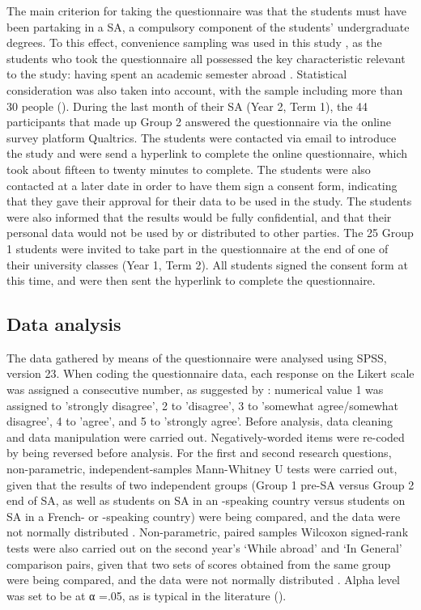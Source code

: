 \documentclass[output=paper]{langsci/langscibook}
\begin{document}
The main criterion for taking the questionnaire was that the students must have been partaking in a SA, a compulsory component of the students’ undergraduate degrees. To this effect, convenience sampling was used in this study \citep{Dörnyei2007}, as the students who took the questionnaire all possessed the key characteristic relevant to the study: having spent an academic semester abroad \citep{Aiken1997}. Statistical consideration was also taken into account, with the sample including more than 30 people (\citealt{HatchLazaraton1991}). During the last month of their SA (Year 2, Term 1), the 44 participants that made up Group 2 answered the questionnaire via the online survey platform Qualtrics. The students were contacted via email to introduce the study and were send a hyperlink to complete the online questionnaire, which took about fifteen to twenty minutes to complete. The students were also contacted at a later date in order to have them sign a consent form, indicating that they gave their approval for their data to be used in the study. The students were also informed that the results would be fully confidential, and that their personal data would not be used by or distributed to other parties.  The 25 Group 1 students were invited to take part in the questionnaire at the end of one of their university classes (Year 1, Term 2). All students signed the consent form at this time, and were then sent the hyperlink to complete the questionnaire.

 
\subsection{Data analysis}


The data gathered by means of the questionnaire were analysed using SPSS, version 23. When coding the questionnaire data, each response on the Likert scale was assigned a consecutive number, as suggested by \citet{DörnyeiCsizér2012}: numerical value 1 was assigned to 'strongly disagree', 2 to 'disagree', 3 to 'somewhat agree/somewhat disagree', 4 to 'agree', and 5 to 'strongly agree'. Before analysis, data cleaning and data manipulation were carried out. Negatively-worded items were re-coded by being reversed before analysis. For the first and second research questions, non-parametric, independent-samples Mann-Whitney U tests were carried out, given that the results of two independent groups (Group 1 pre-SA versus Group 2 end of SA, as well as students on SA in an -speaking country versus students on SA in a French- or -speaking country) were being compared, and the data were not normally distributed \citep{Dörnyei2007}. Non-parametric, paired samples Wilcoxon signed-rank tests were also carried out on the second year’s ‘While  {abroad}’ and ‘In General’ comparison pairs, given that two sets of scores obtained from the same group were being compared, and the data were not normally distributed \citep{Dörnyei2007}. Alpha level was set to be at α =.05, as is typical in the  literature (\citealt{Larson-Hall2012}).  
\end{document}
